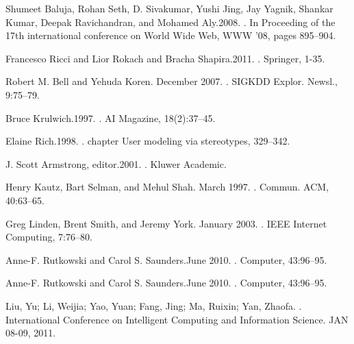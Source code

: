 \begin{thebibliography}{10}

Shumeet Baluja, Rohan Seth, D. Sivakumar, Yushi Jing, Jay Yagnik, Shankar Kumar, Deepak Ravichandran, and Mohamed Aly.2008.
.
\newblock In Proceeding of the 17th international conference on World Wide Web, WWW ’08, pages 895–904.

Francesco Ricci and Lior Rokach and Bracha Shapira.2011.
.
\newblock Springer, 1-35. 

Robert M. Bell and Yehuda Koren. December 2007.
.
\newblock SIGKDD Explor. Newsl., 9:75–79.

Bruce Krulwich.1997.
.
\newblock AI Magazine, 18(2):37–45.

Elaine Rich.1998.
.
\newblock chapter User modeling via stereotypes, 329–342. 

J. Scott Armstrong, editor.2001.
.
\newblock Kluwer Academic.

Henry Kautz, Bart Selman, and Mehul Shah. March 1997.
.
\newblock Commun. ACM, 40:63–65.

Greg Linden, Brent Smith, and Jeremy York. January 2003.
.
\newblock IEEE Internet Computing, 7:76–80.

Anne-F. Rutkowski and Carol S. Saunders.June 2010.
.
\newblock Computer, 43:96–95.

Anne-F. Rutkowski and Carol S. Saunders.June 2010.
.
\newblock Computer, 43:96–95.

Liu, Yu; Li, Weijia; Yao, Yuan; Fang, Jing; Ma, Ruixin; Yan, Zhaofa.
.
\newblock International Conference on Intelligent Computing and Information Science. JAN 08-09, 2011.


\end{thebibliography}
